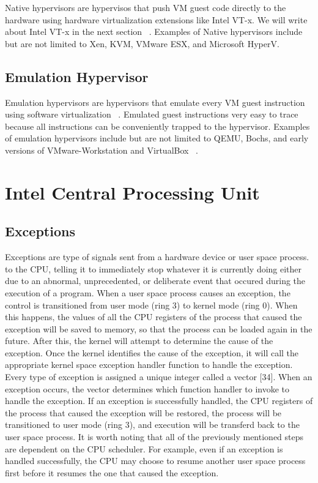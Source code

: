 \documentclass{report}
\begin{document}
\begin{spacing}{1.5}
{\large
Native hypervisors are hypervisos that push VM guest code directly to the hardware using hardware virtualization extensions like Intel VT-x. We will write about Intel VT-x in the next section ~\cite{10.1145/2775111}. Examples of Native hypervisors include but are not limited to Xen, KVM, VMware ESX, and Microsoft HyperV.
\newline
}


\subsection{Emulation Hypervisor}
{\large
Emulation hypervisors are hypervisors that emulate every VM guest instruction using software virtualization ~\cite{10.1145/2775111}. Emulated guest instructions very easy to trace because all instructions can be conveniently trapped to the hypervisor. Examples of emulation hypervisors include but are not limited to  QEMU, Bochs, and early versions of VMware-Workstation and VirtualBox ~\cite{10.1145/2775111}.
\newline
}










\section{Intel Central Processing Unit}


\subsection{Exceptions}
{\large
Exceptions are type of signals sent from a hardware device or user space process. to the CPU, telling it to immediately stop whatever it is currently doing either due to an abnormal, unprecedented, or deliberate event that occured during the execution of a program. When a user space process causes an exception, the control is transitioned from user mode (ring 3) to kernel mode (ring 0). When this happens, the values of all the CPU registers of the process that caused the exception will be saved to memory, so that the process can be loaded again in the future. After this, the kernel will attempt to determine the cause of the exception. Once the kernel identifies the cause of the exception, it will call the appropriate kernel space exception handler function to handle the exception. Every type of exception is assigned a unique integer called a vector [34]. When an exception occurs, the vector determines which function handler to invoke to handle the exception. If an exception is successfully handled, the CPU registers of the process that caused the exception will be restored, the process will be transitioned to user mode (ring 3), and execution will be transferd back to the user space process. It is worth noting that all of the previously mentioned steps are dependent on the CPU scheduler. For example, even if an exception is handled successfully, the CPU may choose to resume another user space process first before it resumes the one that caused the exception.
\newline
}


\end{spacing}
\end{document}
